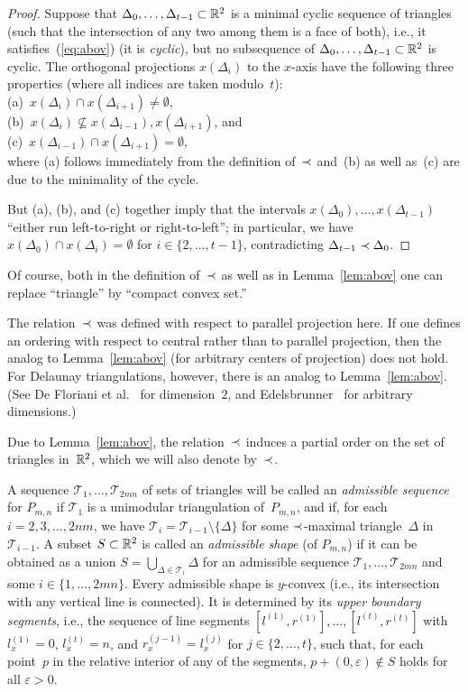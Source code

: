 \begin{proof}
  Suppose that $\Delta_0,\dots,\Delta_{t-1}\subset\mathbb{R}^2$ is a minimal cyclic
  sequence of triangles (such that the intersection of any two among
  them is a face of both), i.e., it satisfies~(\ref{eq:abov}) (it is
  \emph{cyclic}), but no subsequence of
  $\Delta_0,\dots,\Delta_{t-1}\subset\mathbb{R}^2$ is cyclic.  
  The orthogonal projections $x(\Delta_i)$ to the $x$-axis
  have the following three properties (where all
  indices are taken modulo~$t$): 
  \\(a)~$x(\Delta_i)\cap x(\Delta_{i+1})\not=\emptyset$, 
  \\(b)~$x(\Delta_i)\not\subseteq x(\Delta_{i-1}), x(\Delta_{i+1})$, and 
  \\(c)~$x(\Delta_{i-1})\cap x(\Delta_{i+1})=\emptyset$, 
  \\where (a) follows
  immediately from the definition of~$\prec$ and~(b) as well as~(c)
  are due to the minimality of the cycle.
  
  But (a), (b), and (c) together imply that the intervals
  $x(\Delta_0),\dots,x(\Delta_{t-1})$ ``either run left-to-right or
  right-to-left''; in particular, we have
  $x(\Delta_0)\cap x(\Delta_i)=\emptyset$ for $i\in\{2,\dots,t-1\}$,
  contradicting $\Delta_{t-1}\prec\Delta_0$.
\end{proof}


Of course, both in the definition of~$\prec$ as well as in 
Lemma~\ref{lem:abov} one can replace
``triangle'' by ``compact convex set.'' 

The relation~$\prec$ was defined with respect to parallel projection
here.  If one defines an ordering with respect to central rather than
to parallel projection, then the analog to Lemma~\ref{lem:abov} (for
arbitrary centers of projection) does not hold. For Delaunay
triangulations, however, there is an analog to Lemma~\ref{lem:abov}.
(See De Floriani et al.~\cite{DFNP91} for dimension~$2$, and
Edelsbrunner~\cite{Edelsbrunner92} for arbitrary dimensions.)

Due to Lemma~\ref{lem:abov}, the relation~$\prec$ induces 
a partial order on the set of triangles
in~$\mathbb{R}^2$, which we will also denote by~$\prec$.


A sequence $\mathcal{T}_1,\dots,\mathcal{T}_{2mn}$ of sets of
triangles will be called an \emph{admissible sequence} for $P_{m,n}$
if $\mathcal{T}_1$ is a unimodular triangulation of~$P_{m,n}$, and if,
for each $i=2,3,\dots,2nm$, we have
$\mathcal{T}_i=\mathcal{T}_{i-1}\setminus\{\Delta\}$ for some
$\prec$-maximal triangle~$\Delta$ in~$\mathcal{T}_{i-1}$.  A subset
$S\subset\mathbb{R}^2$ is called an \emph{admissible shape} (of $P_{m,n}$) if
it can be obtained as a union
$S=\bigcup_{\Delta\in\mathcal{T}_i}\Delta$ for an admissible sequence
$\mathcal{T}_1,\dots,\mathcal{T}_{2mn}$ and some
$i\in\{1,\dots,2mn\}$.  Every admissible shape is $y$-convex (i.e.,
its intersection with any vertical line is connected). It is
determined by its \emph{upper boundary segments}, i.e., the sequence
of line segments $[l^{(1)},r^{(1)}],\dots,[l^{(t)},r^{(t)}]$ with
$l^{(1)}_x=0$, $l^{(t)}_x=n$, and $r^{(j-1)}_x=l^{(j)}_x$ for
$j\in\{2,\dots,t\}$, such that, for each point~$p$ in the relative
interior of any of the segments, $p+(0,\varepsilon)\not\in S$ holds
for all $\varepsilon>0$.

